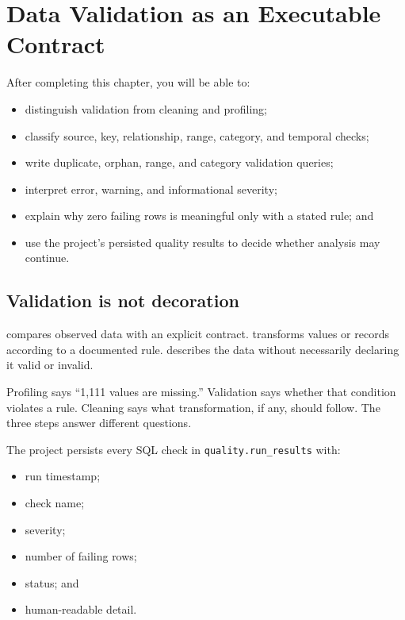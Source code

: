 \chapter{Data Validation as an Executable Contract}
\label{ch:data-validation}

\begin{learningobjectives}
After completing this chapter, you will be able to:
\begin{itemize}
  \item distinguish validation from cleaning and profiling;
  \item classify source, key, relationship, range, category, and temporal checks;
  \item write duplicate, orphan, range, and category validation queries;
  \item interpret error, warning, and informational severity;
  \item explain why zero failing rows is meaningful only with a stated rule; and
  \item use the project's persisted quality results to decide whether analysis
    may continue.
\end{itemize}
\end{learningobjectives}

\section{Validation is not decoration}

 compares observed data with an explicit contract.
 transforms values or records according to a documented
rule.  describes the data without necessarily declaring it
valid or invalid.

\begin{plainlanguage}
Profiling says ``1,111 values are missing.'' Validation says whether that
condition violates a rule. Cleaning says what transformation, if any, should
follow. The three steps answer different questions.
\end{plainlanguage}

The project persists every SQL check in \texttt{quality.run\_results} with:
\begin{itemize}
  \item run timestamp;
  \item check name;
  \item severity;
  \item number of failing rows;
  \item status; and
  \item human-readable detail.
\end{itemize}

